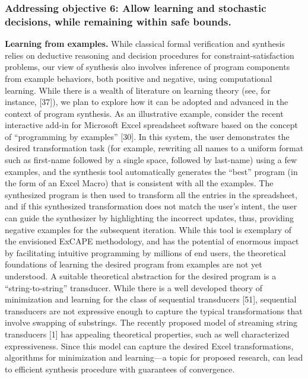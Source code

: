 \subsubsection{Addressing objective 6: Allow learning and stochastic decisions, while remaining within safe bounds.}


\textbf{Learning from examples.} While classical formal verification and synthesis relies on deductive reasoning and decision procedures for constraint-satisfaction problems, our view of synthesis also involves inference of program components from example behaviors, both positive and negative, using computational learning. While there is a wealth of literature on learning theory (see, for instance, [37]), we plan to explore how it can be adopted and advanced in the context of program synthesis. As an illustrative example, consider the recent interactive add-in for Microsoft Excel spreadsheet software based on the concept of “programming by examples” [30]. In this system, the user demonstrates the desired transformation task (for example, rewriting all names to a uniform format such as first-name followed by a single space, followed by last-name) using a few examples, and the synthesis tool automatically generates the “best” program (in the form of an Excel Macro) that is consistent with all the examples. The synthesized program is then used to transform all the entries in the spreadsheet, and if this synthesized transformation does not match the user’s intent, the user can guide the synthesizer by highlighting the incorrect updates, thus, providing negative examples for the subsequent iteration. While this tool is exemplary of the envisioned ExCAPE methodology, and has the potential of enormous impact by facilitating intuitive programming by millions of end users, the theoretical foundations of learning the desired program from examples are not yet understood. A suitable theoretical abstraction for the desired program is a “string-to-string” transducer. While there is a well developed theory of minimization and learning for the class of sequential transducers [51], sequential transducers are not expressive enough to capture the typical transformations that involve swapping of substrings. The recently proposed model of streaming string transducers [1] has appealing theoretical properties, such as well characterized expressiveness. Since this model can capture the desired Excel transformations, algorithms for minimization and learning—a topic for proposed research, can lead to efficient synthesis procedure with guarantees of convergence.


